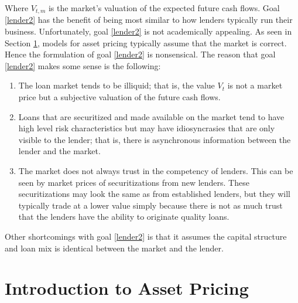 \documentclass{article}
\theoremstyle{definition}
\begin{document}
Where \(V_{t, m}\) is the market's valuation of the expected future cash flows.  Goal \ref{lender2} has the benefit of being most similar to how lenders typically run their business.  Unfortunately, goal \ref{lender2} is not academically appealing.  As seen in Section \ref{assetPricing}, models for asset pricing typically assume that the market is correct.  Hence the formulation of goal \ref{lender2} is nonsensical.  The reason that goal \ref{lender2} makes some sense is the following:


\begin{enumerate}
	\item The loan market tends to be illiquid; that is, the value \(V_t\) is not a market price but a subjective valuation of the future cash flows.
	\item Loans that are securitized and made available on the market tend to have high level risk characteristics but may have idiosyncrasies that are only visible to the lender; that is, there is asynchronous information between the lender and the market.  
	\item The market does not always trust in the competency of lenders.  This can be seen by market prices of securitizations from new lenders.  These securitizations may look the same as from established lenders, but they will typically trade at a lower value simply because there is not as much trust that the lenders have the ability to originate quality loans.  
	
\end{enumerate}

Other shortcomings with goal \ref{lender2} is that it assumes the capital structure and loan mix is identical between the market and the lender.  


\section{Introduction to Asset Pricing} \label{assetPricing}
\end{document}
